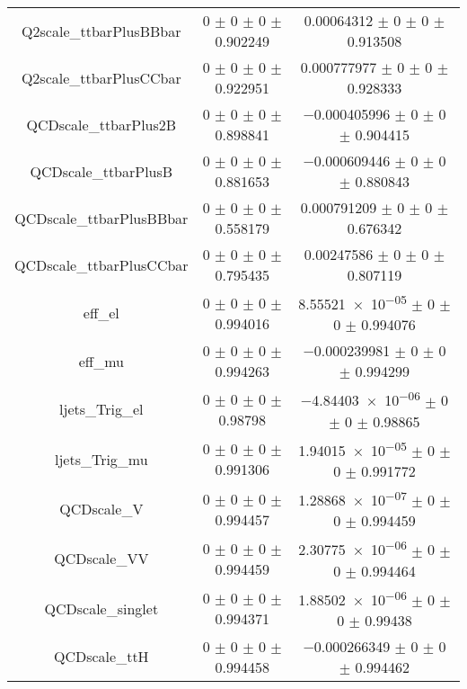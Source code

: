 \begin{table}
\begin{tabular}{ccc}
Q2scale\_ttbarPlusBBbar & \num{0} $\pm$ \num{0} $\pm$ \num{0} $\pm$ \num{0.902249} & \num{0.00064312} $\pm$ \num{0} $\pm$ \num{0} $\pm$ \num{0.913508}\\
Q2scale\_ttbarPlusCCbar & \num{0} $\pm$ \num{0} $\pm$ \num{0} $\pm$ \num{0.922951} & \num{0.000777977} $\pm$ \num{0} $\pm$ \num{0} $\pm$ \num{0.928333}\\
QCDscale\_ttbarPlus2B & \num{0} $\pm$ \num{0} $\pm$ \num{0} $\pm$ \num{0.898841} & \num{-0.000405996} $\pm$ \num{0} $\pm$ \num{0} $\pm$ \num{0.904415}\\
QCDscale\_ttbarPlusB & \num{0} $\pm$ \num{0} $\pm$ \num{0} $\pm$ \num{0.881653} & \num{-0.000609446} $\pm$ \num{0} $\pm$ \num{0} $\pm$ \num{0.880843}\\
QCDscale\_ttbarPlusBBbar & \num{0} $\pm$ \num{0} $\pm$ \num{0} $\pm$ \num{0.558179} & \num{0.000791209} $\pm$ \num{0} $\pm$ \num{0} $\pm$ \num{0.676342}\\
QCDscale\_ttbarPlusCCbar & \num{0} $\pm$ \num{0} $\pm$ \num{0} $\pm$ \num{0.795435} & \num{0.00247586} $\pm$ \num{0} $\pm$ \num{0} $\pm$ \num{0.807119}\\
eff\_el & \num{0} $\pm$ \num{0} $\pm$ \num{0} $\pm$ \num{0.994016} & \num{8.55521e-05} $\pm$ \num{0} $\pm$ \num{0} $\pm$ \num{0.994076}\\
eff\_mu & \num{0} $\pm$ \num{0} $\pm$ \num{0} $\pm$ \num{0.994263} & \num{-0.000239981} $\pm$ \num{0} $\pm$ \num{0} $\pm$ \num{0.994299}\\
ljets\_Trig\_el & \num{0} $\pm$ \num{0} $\pm$ \num{0} $\pm$ \num{0.98798} & \num{-4.84403e-06} $\pm$ \num{0} $\pm$ \num{0} $\pm$ \num{0.98865}\\
ljets\_Trig\_mu & \num{0} $\pm$ \num{0} $\pm$ \num{0} $\pm$ \num{0.991306} & \num{1.94015e-05} $\pm$ \num{0} $\pm$ \num{0} $\pm$ \num{0.991772}\\
QCDscale\_V & \num{0} $\pm$ \num{0} $\pm$ \num{0} $\pm$ \num{0.994457} & \num{1.28868e-07} $\pm$ \num{0} $\pm$ \num{0} $\pm$ \num{0.994459}\\
QCDscale\_VV & \num{0} $\pm$ \num{0} $\pm$ \num{0} $\pm$ \num{0.994459} & \num{2.30775e-06} $\pm$ \num{0} $\pm$ \num{0} $\pm$ \num{0.994464}\\
QCDscale\_singlet & \num{0} $\pm$ \num{0} $\pm$ \num{0} $\pm$ \num{0.994371} & \num{1.88502e-06} $\pm$ \num{0} $\pm$ \num{0} $\pm$ \num{0.99438}\\
QCDscale\_ttH & \num{0} $\pm$ \num{0} $\pm$ \num{0} $\pm$ \num{0.994458} & \num{-0.000266349} $\pm$ \num{0} $\pm$ \num{0} $\pm$ \num{0.994462}\\

\end{tabular}
\end{table}
